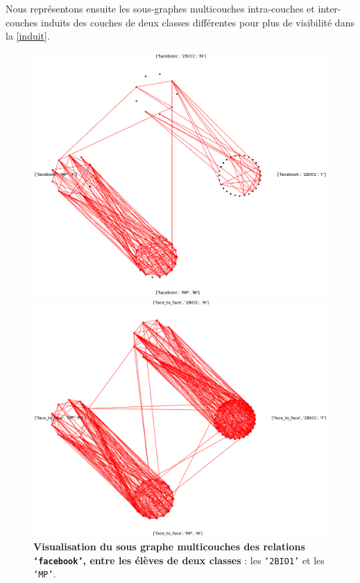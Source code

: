 \documentclass[11pt,a4paper]{article}
\theoremstyle{definition}
\theoremstyle{remark}
\theoremstyle{remark}
\begin{document}
	Nous représentons ensuite les sous-graphes multicouches intra-couches et inter-couches induits des couches de deux classes différentes pour plus de visibilité dans la \cref{induit}.

\begin{figure}[H]
	\begin{minipage}[t]{0.48\textwidth}
		\captionsetup{margin=10pt}
		\includegraphics[width=\textwidth]{sousmulticlasse.png}
	\caption{\textbf{Visualisation du sous graphe multicouches des relations \texttt{`facebook'}, entre les élèves de deux classes} : les \texttt{`2BIO1'} et les \texttt{`MP'}.}
	\end{minipage}
	\begin{minipage}[t]{0.48\textwidth}
		\centering
		\includegraphics[width=\textwidth]{sousmulticlasseftf.png}

\end{minipage}
\end{figure}
\end{document}

